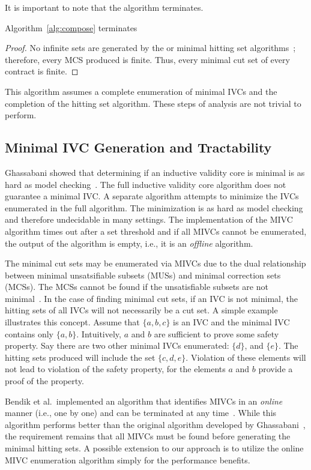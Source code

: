 It is important to note that the algorithm terminates. 
\begin{theorem}
Algorithm~\ref{alg:compose} terminates
\begin{proof}
No infinite sets are generated by the \aivcalg or minimal hitting set algorithms~\cite{Ghassabani2017EfficientGO,murakami2013efficient}; therefore, every MCS produced is finite. Thus, every minimal cut set of every contract is finite.
\end{proof}
\end{theorem}

This algorithm assumes a complete enumeration of minimal IVCs and the completion of the hitting set algorithm. These steps of analysis are not trivial to perform. 

\subsection{Minimal IVC Generation and Tractability}
Ghassabani showed that determining if an inductive validity core is minimal is as hard as model checking~\cite{ghassabani_2018, Ghassabani2017EfficientGO}. The full inductive validity core algorithm does not guarantee a minimal IVC. A separate algorithm attempts to minimize the IVCs enumerated in the full algorithm. The minimization is as hard as model checking and therefore undecidable in many settings. The implementation of the MIVC algorithm times out after a set threshold and if all MIVCs cannot be enumerated, the output of the algorithm is empty, i.e., it is an {\em offline} algorithm. 

The minimal cut sets may be enumerated via MIVCs due to the dual relationship between minimal unsatsifiable subsets (MUSs) and minimal correction sets (MCSs). The MCSs cannot be found if the unsatisfiable subsets are not minimal~\cite{liffiton2016fast}. In the case of finding minimal cut sets, if an IVC is not minimal, the hitting sets of all IVCs will not necessarily be a cut set. A simple example illustrates this concept. Assume that $\{a,b,c\}$ is an IVC and the minimal IVC contains only $\{a,b\}$. Intuitively, $a$ and $b$ are sufficient to prove some safety property. Say there are two other minimal IVCs enumerated: $\{d\}$, and $\{e\}$.  The hitting sets produced will include the set $\{c, d, e\}$. Violation of these elements will not lead to violation of the safety property, for the elements $a$ and $b$ provide a proof of the property. 

Bendik et al.~implemented an algorithm that identifies MIVCs in an {\em online} manner (i.e., one by one) and can be terminated at any time~\cite{bendik2018online}. While this algorithm performs better than the original \aivcalg algorithm developed by Ghassabani~\cite{Ghassabani2017EfficientGO}, the requirement remains that all MIVCs must be found before generating the minimal hitting sets. A possible extension to our approach is to utilize the online MIVC enumeration algorithm simply for the performance benefits. 

